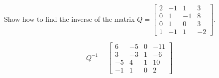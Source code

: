 
\begin{exerciseStatement}


Show how to find the inverse of the matrix \(Q= \left[\begin{array}{cccc}
2 & -1 & 1 & 3 \\
0 & 1 & -1 & 8 \\
0 & 1 & 0 & 3 \\
1 & -1 & 1 & -2
\end{array}\right] \).


\end{exerciseStatement}
    
\begin{exerciseAnswer} 
\[Q^{-1}= \left[\begin{array}{cccc}
6 & -5 & 0 & -11 \\
3 & -3 & 1 & -6 \\
-5 & 4 & 1 & 10 \\
-1 & 1 & 0 & 2
\end{array}\right] \]
\end{exerciseAnswer}
    
